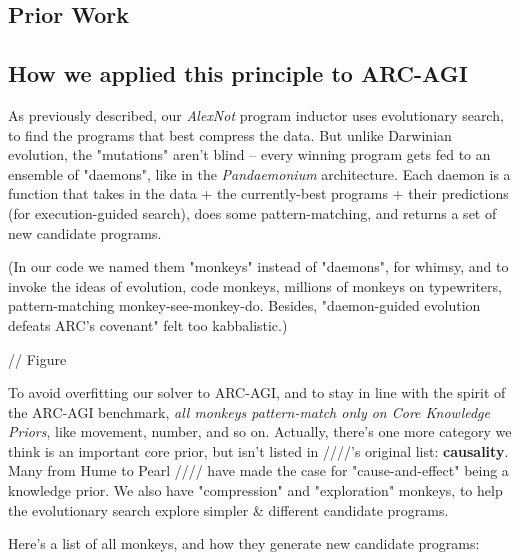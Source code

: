 \documentclass{article}
\begin{document}
\subsection{Prior Work}

\subsection{How we applied this principle to ARC-AGI}

As previously described, our \textit{AlexNot} program inductor uses evolutionary search, to find the programs that best compress the data. But unlike Darwinian evolution, the "mutations" aren't blind -- every winning program gets fed to an ensemble of "daemons", like in the \textit{Pandaemonium} architecture. Each daemon is a function that takes in the data + the currently-best programs + their predictions (for execution-guided search), does some pattern-matching, and returns a set of new candidate programs.

(In our code we named them "monkeys" instead of "daemons", for whimsy, and to invoke the ideas of evolution, code monkeys, millions of monkeys on typewriters, pattern-matching monkey-see-monkey-do. Besides, "daemon-guided evolution defeats ARC's covenant" felt too kabbalistic.)

// Figure

To avoid overfitting our solver to ARC-AGI, and to stay in line with the spirit of the ARC-AGI benchmark, \textit{all monkeys pattern-match only on Core Knowledge Priors}, like movement, number, and so on. Actually, there's one more category we think is an important core prior, but isn't listed in ////'s original list: \textbf{causality}. Many from Hume to Pearl //// have made the case for "cause-and-effect" being a knowledge prior. We also have "compression" and "exploration" monkeys, to help the evolutionary search explore simpler \& different candidate programs.

Here's a list of all monkeys, and how they generate new candidate programs:
\end{document}
